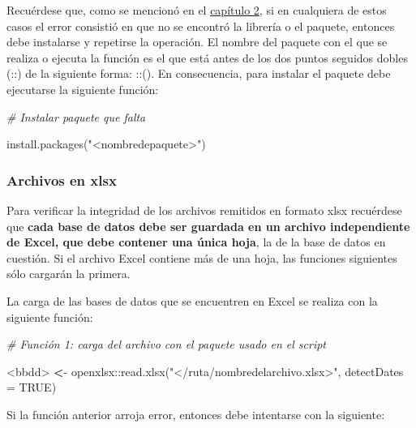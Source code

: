 \documentclass[
  spanish,
]{book}
\newenvironment{Shaded}{\begin{snugshade}}{\end{snugshade}}
\newcommand{\AttributeTok}[1]{\textcolor[rgb]{0.77,0.63,0.00}{#1}}
\newcommand{\CommentTok}[1]{\textcolor[rgb]{0.56,0.35,0.01}{\textit{#1}}}
\newcommand{\ConstantTok}[1]{\textcolor[rgb]{0.00,0.00,0.00}{#1}}
\newcommand{\ErrorTok}[1]{\textcolor[rgb]{0.64,0.00,0.00}{\textbf{#1}}}
\newcommand{\FunctionTok}[1]{\textcolor[rgb]{0.00,0.00,0.00}{#1}}
\newcommand{\NormalTok}[1]{#1}
\newcommand{\SpecialCharTok}[1]{\textcolor[rgb]{0.00,0.00,0.00}{#1}}
\newcommand{\StringTok}[1]{\textcolor[rgb]{0.31,0.60,0.02}{#1}}
\begin{document}
Recuérdese que, como se mencionó en el \protect\hyperlink{formatos_manual}{capítulo 2}, si en cualquiera de estos casos el error consistió en que no se encontró la librería o el paquete, entonces debe instalarse y repetirse la operación. El nombre del paquete con el que se realiza o ejecuta la función es el que está antes de los dos puntos seguidos dobles (::) de la siguiente forma: ::(). En consecuencia, para instalar el paquete debe ejecutarse la siguiente función:

\begin{Shaded}
\begin{Highlighting}[]
\CommentTok{\# Instalar paquete que falta}

\FunctionTok{install.packages}\NormalTok{(}\StringTok{"\textless{}nombredepaquete\textgreater{}"}\NormalTok{)}
\end{Highlighting}
\end{Shaded}

\hypertarget{archivos-en-xlsx}{%
\subsubsection{Archivos en xlsx}\label{archivos-en-xlsx}}

Para verificar la integridad de los archivos remitidos en formato xlsx recuérdese que \textbf{cada base de datos debe ser guardada en un archivo independiente de Excel, que debe contener una única hoja}, la de la base de datos en cuestión. Si el archivo Excel contiene más de una hoja, las funciones siguientes sólo cargarán la primera.

La carga de las bases de datos que se encuentren en Excel se realiza con la siguiente función:

\begin{Shaded}
\begin{Highlighting}[]
\CommentTok{\# Función 1: carga del archivo con el paquete usado en el script }

\SpecialCharTok{\textless{}}\NormalTok{bbdd}\SpecialCharTok{\textgreater{}} \ErrorTok{\textless{}}\SpecialCharTok{{-}}\NormalTok{ openxlsx}\SpecialCharTok{::}\FunctionTok{read.xlsx}\NormalTok{(}\StringTok{"\textless{}/ruta/nombredelarchivo.xlsx\textgreater{}"}\NormalTok{,  }\AttributeTok{detectDates =} \ConstantTok{TRUE}\NormalTok{)}
\end{Highlighting}
\end{Shaded}

Si la función anterior arroja error, entonces debe intentarse con la siguiente:
\end{document}
